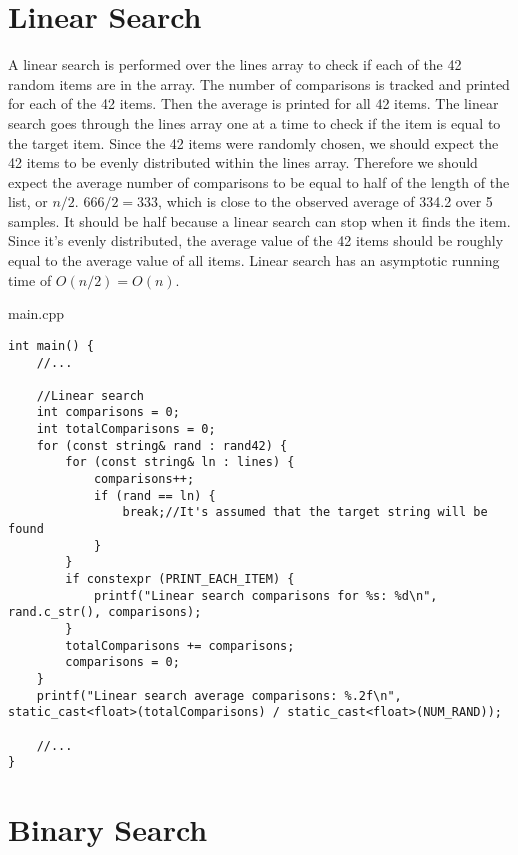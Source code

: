 \documentclass[letterpaper, 10pt,DIV=13]{scrartcl}
\numberwithin{equation}{section} %
\numberwithin{figure}{section} %
\numberwithin{table}{section} %
\begin{document}
\section{Linear Search}

A linear search is performed over the lines array to check if each of the 42 random items are in the array.
The number of comparisons is tracked and printed for each of the 42 items. Then the average is printed for all
42 items. The linear search goes through the lines array one at a time to check if the item is equal to the
target item. Since the 42 items were randomly chosen, we should expect the 42 items to be evenly distributed
within the lines array. Therefore we should expect the average number of comparisons to be equal to half of
the length of the list, or $n/2$. $666/2=333$, which is close to the observed average of 334.2 over 5 samples.
It should be half because a linear search can stop when it finds the item. Since it's evenly distributed, the
average value of the 42 items should be roughly equal to the average value of all items. Linear search has an
asymptotic running time of $O(n/2) = O(n)$.

main.cpp
\begin{verbatim}
int main() {
    //...

    //Linear search
    int comparisons = 0;
    int totalComparisons = 0;
    for (const string& rand : rand42) {
        for (const string& ln : lines) {
            comparisons++;
            if (rand == ln) {
                break;//It's assumed that the target string will be found
            }
        }
        if constexpr (PRINT_EACH_ITEM) {
            printf("Linear search comparisons for %s: %d\n", rand.c_str(), comparisons);
        }
        totalComparisons += comparisons;
        comparisons = 0;
    }
    printf("Linear search average comparisons: %.2f\n", static_cast<float>(totalComparisons) / static_cast<float>(NUM_RAND));

    //...
}
\end{verbatim}

\section{Binary Search}
\end{document}
